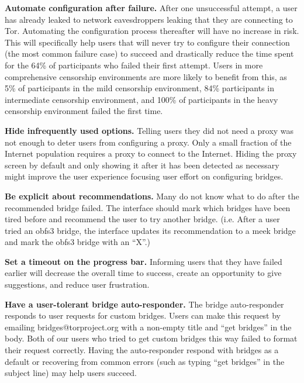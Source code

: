\documentclass[USenglish,oneside,twocolumn]{article}
\begin{document}
\begin{description}
\item {\bfseries Automate configuration after failure.} After one unsuccessful attempt, a user has already leaked to network eavesdroppers leaking that they are connecting to Tor. Automating the configuration process thereafter will have no increase in risk. This will specifically help users that will never try to configure their connection (the most common failure case) to succeed and drastically reduce the time spent for the 64\% of participants who failed their first attempt. Users in more comprehensive censorship environments are more likely to benefit from this, as 5\% of participants in the mild censorship environment, 84\% participants in intermediate censorship environment, and 100\% of participants in the heavy censorship environment failed the first time.
\item{\bfseries Hide infrequently used options.} Telling users they did not need a proxy was not enough to deter users from configuring a proxy. Only a small fraction of the Internet population requires a proxy to connect to the Internet. Hiding the proxy screen by default and only showing it after it has been detected as necessary might improve the user experience focusing user effort on configuring bridges.
\item {\bfseries Be explicit about recommendations.} Many do not know what to do after the recommended bridge failed. The interface should mark which bridges have been tired before and recommend the user to try another bridge. (i.e. After a user tried an obfs3 bridge, the interface updates its recommendation to a meek bridge and mark the obfs3 bridge with an ``X''.)
\item{\bfseries Set a timeout on the progress bar.} Informing users that they have failed earlier will decrease the overall time to success, create an opportunity to give suggestions, and reduce user frustration. 
\item{\bfseries Have a user-tolerant bridge auto-responder.} The bridge auto-responder responds to user requests for custom bridges. Users can make this request by emailing bridges@torproject.org with a non-empty title and ``get bridges'' in the body. Both of our users who tried to get custom bridges this way failed to format their request correctly. Having the auto-responder respond with bridges as a default or recovering from common errors (such as typing ``get bridges'' in the subject line) may help users succeed. 
\end{description} 
\end{document}
